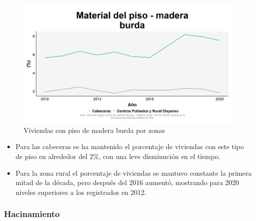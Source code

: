     \begin{figure}[H]
        \caption{Viviendas con piso de madera burda por zonas \label{map_result_2} }
        \begin{center}
        \includegraphics[width=\textwidth,keepaspectratio]{img/var_176_trend.png}
        \end{center}
    \end{figure}
            \begin{itemize}
                    \item Para las cabeceras se ha mantenido el porcentaje de viviendas con este tipo de piso en alrededor del 2\%, con una leve disminución en el tiempo.
                    \item Para la zona rural el porcentaje de viviendas se mantuvo constante la primera mitad de la década, pero después del 2016 aumentó, mostrando para 2020 niveles superiores a los registrados en 2012.
                    \end{itemize}

        \subsubsection{Hacinamiento}

